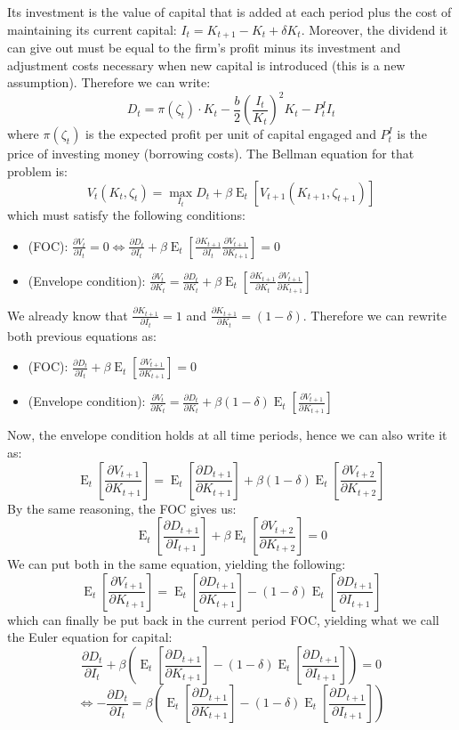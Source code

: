 \documentclass[12pt]{report}
\newcommand{\Et}[1]{\operatorname{E}_t\left[#1\right]}
\begin{document}
Its investment is the value of capital that is added at each period plus the cost of maintaining its current capital: $I_t = K_{t+1} - K_t + \delta K_t$. Moreover, the dividend it can give out must be equal to the firm's profit minus its investment and adjustment costs necessary when new capital is introduced (this is a new assumption). Therefore we can write: $$D_t = \pi(\zeta_t)\cdot K_t - \frac{b}{2}\left(\frac{I_t}{K_t}\right)^2K_t - P_t^II_t $$ where $\pi(\zeta_t)$ is the expected profit per unit of capital engaged and $P_t^I$ is the price of investing money (borrowing costs). The Bellman equation for that problem is: $$V_t(K_t,\zeta_t) = \max_{I_t} D_t + \beta\Et{V_{t+1}(K_{t+1}, \zeta_{t+1})}  $$ which must satisfy the following conditions:\begin{itemize}
\item (FOC): $\frac{\partial V_t}{\partial I_t} = 0 \Leftrightarrow \frac{\partial D_t}{\partial I_t} + \beta \Et{ \frac{\partial K_{t+1}}{\partial I_t}\frac{\partial V_{t+1}}{\partial K_{t+1}}} = 0 $
\item (Envelope condition): $\frac{\partial V_t}{\partial K_t} = \frac{\partial D_t}{\partial K_t} + \beta \Et{\frac{\partial K_{t+1}}{\partial K_t}\frac{\partial V_{t+1}}{\partial K_{t+1}}} $
\end{itemize} We already know that $\frac{\partial K_{t+1}}{\partial I_t} = 1$ and $\frac{\partial K_{t+1}}{\partial K_t} = (1-\delta)$. Therefore we can rewrite both previous equations as: \begin{itemize}
\item (FOC): $\frac{\partial D_t}{\partial I_t} + \beta \Et{ \frac{\partial V_{t+1}}{\partial K_{t+1}}} = 0 $
\item (Envelope condition): $\frac{\partial V_t}{\partial K_t} = \frac{\partial D_t}{\partial K_t} + \beta (1-\delta) \Et{\frac{\partial V_{t+1}}{\partial K_{t+1}}} $
\end{itemize}

Now, the envelope condition holds at all time periods, hence we can also write it as: $$\Et{\frac{\partial V_{t+1}}{\partial K_{t+1}}} = \Et{ \frac{\partial D_{t+1}}{\partial K_{t+1}}} + \beta (1-\delta) \Et{\frac{\partial V_{t+2}}{\partial K_{t+2}}} $$ By the same reasoning, the FOC gives us: $$\Et{\frac{\partial D_{t+1}}{\partial I_{t+1}}} + \beta \Et{ \frac{\partial V_{t+2}}{\partial K_{t+2}}} = 0 $$ We can put both in the same equation, yielding the following: $$ \Et{\frac{\partial V_{t+1}}{\partial K_{t+1}}} = \Et{ \frac{\partial D_{t+1}}{\partial K_{t+1}}} - (1-\delta) \Et{\frac{\partial D_{t+1}}{\partial I_{t+1}}} $$ which can finally be put back in the current period FOC, yielding what we call the Euler equation for capital: $$\frac{\partial D_t}{\partial I_t} + \beta \left(\Et{ \frac{\partial D_{t+1}}{\partial K_{t+1}}} - (1-\delta) \Et{\frac{\partial D_{t+1}}{\partial I_{t+1}}}\right) = 0 $$ $$\Leftrightarrow - \frac{\partial D_t}{\partial I_t} = \beta \left(\Et{ \frac{\partial D_{t+1}}{\partial K_{t+1}}} - (1-\delta) \Et{\frac{\partial D_{t+1}}{\partial I_{t+1}}}\right) $$
\end{document}

